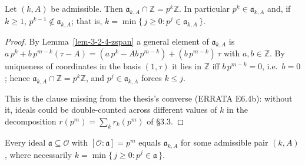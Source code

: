 \begin{lemma}
  \label{lem-3-2-4-minpow}
  Let $(k, A)$ be admissible. Then $\mathfrak{a}_{k,A} \cap \mathbb{Z} = p^k\mathbb{Z}$.
  In particular $p^k \in \mathfrak{a}_{k,A}$ and, if $k \ge 1$,
  $p^{k-1} \notin \mathfrak{a}_{k,A}$; that is,
  $k = \min\{\, j \ge 0 : p^j \in \mathfrak{a}_{k,A} \,\}$.
\end{lemma}

\begin{proof}
  By Lemma~\ref{lem-3-2-4-zspan} a general element of $\mathfrak{a}_{k,A}$ is
  $a\,p^k + b\,p^{m-k}(\tau - A)
   = (a\,p^k - Ab\,p^{m-k}) + (b\,p^{m-k})\,\tau$ with $a, b \in \mathbb{Z}$.
  By uniqueness of coordinates in the basis $(1, \tau)$ it lies in $\mathbb{Z}$
  iff $b\,p^{m-k} = 0$, i.e.\ $b = 0$; hence
  $\mathfrak{a}_{k,A} \cap \mathbb{Z} = p^k\mathbb{Z}$, and $p^j \in \mathfrak{a}_{k,A}$
  forces $k \le j$.

  This is the clause missing from the thesis's converse (ERRATA E6.4b): without
  it, ideals could be double-counted across different values of $k$ in the
  decomposition $r(p^m) = \sum_k r_k(p^m)$ of \S 3.3.
\end{proof}

\begin{proposition}
  \label{lem-3-2-4-exists}
  Every ideal $\mathfrak{a} \subseteq \mathcal{O}$ with
  $[\mathcal{O} : \mathfrak{a}] = p^m$ equals $\mathfrak{a}_{k,A}$ for some
  admissible pair $(k, A)$, where necessarily
  $k = \min\{\, j \ge 0 : p^j \in \mathfrak{a}\,\}$.
\end{proposition}

